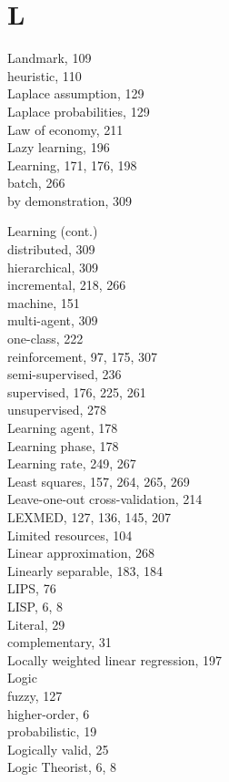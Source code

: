 \documentclass[10pt]{article}
\begin{document}
\section*{L}
Landmark, 109\\
heuristic, 110\\
Laplace assumption, 129\\
Laplace probabilities, 129\\
Law of economy, 211\\
Lazy learning, 196\\
Learning, 171, 176, 198\\
batch, 266\\
by demonstration, 309

Learning (cont.)\\
distributed, 309\\
hierarchical, 309\\
incremental, 218, 266\\
machine, 151\\
multi-agent, 309\\
one-class, 222\\
reinforcement, 97, 175, 307\\
semi-supervised, 236\\
supervised, 176, 225, 261\\
unsupervised, 278\\
Learning agent, 178\\
Learning phase, 178\\
Learning rate, 249, 267\\
Least squares, 157, 264, 265, 269\\
Leave-one-out cross-validation, 214\\
LEXMED, 127, 136, 145, 207\\
Limited resources, 104\\
Linear approximation, 268\\
Linearly separable, 183, 184\\
LIPS, 76\\
LISP, 6, 8\\
Literal, 29\\
complementary, 31\\
Locally weighted linear regression, 197\\
Logic\\
fuzzy, 127\\
higher-order, 6\\
probabilistic, 19\\
Logically valid, 25\\
Logic Theorist, 6, 8
\end{document}
